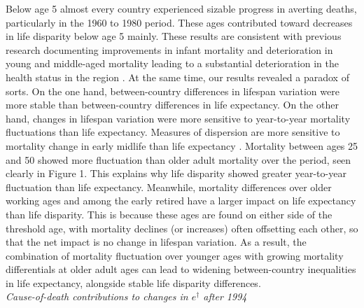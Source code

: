 \documentclass{article}
\begin{document}
\begin{spacing}{1.5}
Below age 5 almost every country experienced sizable progress in averting deaths, particularly in the 1960 to 1980 period. These ages contributed toward decreases in life disparity below age 5 mainly. These results are consistent with previous research documenting improvements in infant mortality and deterioration in young and middle-aged mortality leading to a substantial deterioration in 
the health status in the region \citep{chenet1996}. 
At the same time, our results revealed a paradox of sorts. On the one hand, between-country diﬀerences in lifespan variation were more stable than between-country diﬀerences in life expectancy. On the other hand, changes in lifespan variation were more sensitive to year-to-year mortality ﬂuctuations than life expectancy. Measures of dispersion are more sensitive to mortality change in early midlife than life expectancy \citep{vanraalte2013}. Mortality between ages 25 and 50 showed more fluctuation than older adult mortality over the period, seen clearly in Figure 1. This explains why life disparity showed greater year-to-year fluctuation than life expectancy. Meanwhile, mortality differences over older working ages and among the early retired have a larger impact on life expectancy than life disparity. This is because these ages are found on either side of the threshold age, with mortality declines (or increases) often offsetting each other, so that the net impact is no change in lifespan variation. As a result, the combination of mortality fluctuation over younger ages with growing mortality differentials at older adult ages can lead to widening between-country inequalities in life expectancy, alongside stable life disparity differences.
\\

\emph{Cause-of-death contributions to changes in $e^\dagger$ after 1994}\\


\end{spacing}
\end{document}

